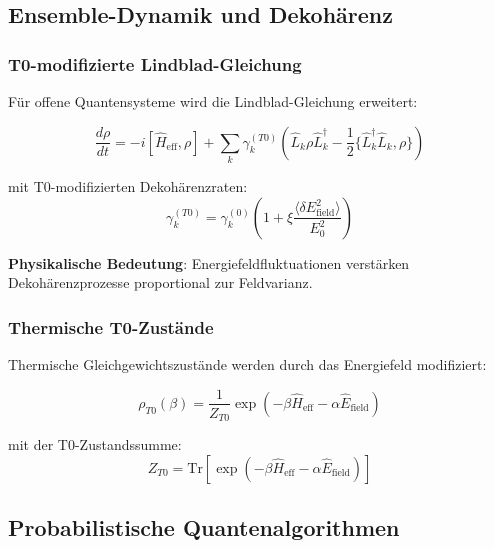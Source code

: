 \documentclass[12pt,a4paper]{article}
\newcommand{\xipar}{\xi}
\theoremstyle{definition}
\theoremstyle{remark}
\begin{document}
\subsection{Ensemble-Dynamik und Dekohärenz}

\subsubsection{T0-modifizierte Lindblad-Gleichung}

Für offene Quantensysteme wird die Lindblad-Gleichung erweitert:

\begin{equation}
	\boxed{\frac{d\rho}{dt} = -i[\hat{H}_{\text{eff}}, \rho] + \sum_k \gamma_k^{(T0)} \left( \hat{L}_k \rho \hat{L}_k^\dagger - \frac{1}{2}\{\hat{L}_k^\dagger \hat{L}_k, \rho\} \right)}
	\label{eq:t0_lindblad}
\end{equation}

mit T0-modifizierten Dekohärenzraten:
\begin{equation}
	\gamma_k^{(T0)} = \gamma_k^{(0)} \left(1 + \xipar \frac{\langle \delta E_{\text{field}}^2 \rangle}{E_0^2}\right)
	\label{eq:modified_decoherence}
\end{equation}

\textbf{Physikalische Bedeutung}: Energiefeldfluktuationen verstärken Dekohärenzprozesse proportional zur Feldvarianz.

\subsubsection{Thermische T0-Zustände}

Thermische Gleichgewichtszustände werden durch das Energiefeld modifiziert:

\begin{equation}
	\rho_{T0}(\beta) = \frac{1}{Z_{T0}} \exp\left(-\beta \hat{H}_{\text{eff}} - \alpha \hat{E}_{\text{field}}\right)
	\label{eq:t0_thermal_state}
\end{equation}

mit der T0-Zustandssumme:
\begin{equation}
	Z_{T0} = \text{Tr}\left[\exp\left(-\beta \hat{H}_{\text{eff}} - \alpha \hat{E}_{\text{field}}\right)\right]
	\label{eq:t0_partition_function}
\end{equation}

\subsection{Probabilistische Quantenalgorithmen}
\end{document}
